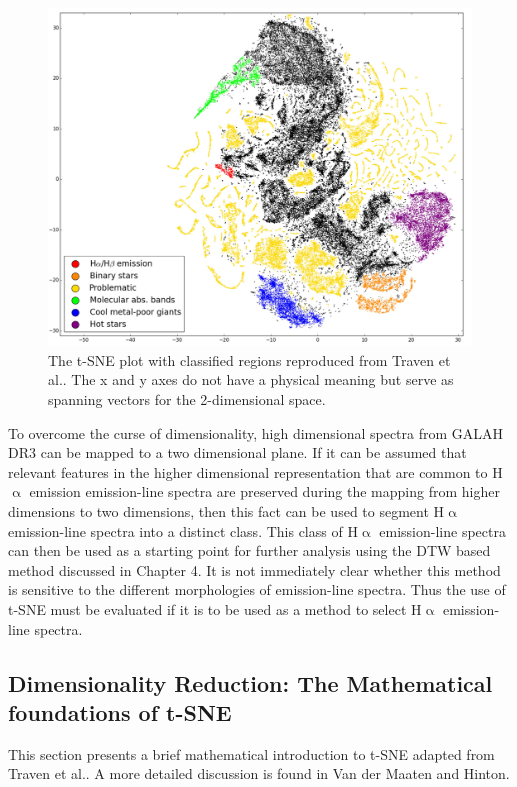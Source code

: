 \begin{figure}[!htb]
\centering
\includegraphics[scale=0.40]{figures/tsne traven.png}
\caption{The t-SNE plot with classified regions reproduced from Traven et al.\cite{traven2017galah}. The x and y axes do not have a physical meaning but serve as spanning vectors for the 2-dimensional space.}
\end{figure}

To overcome the curse of dimensionality, high dimensional spectra from GALAH DR3 can be mapped to a two dimensional plane. If it can be assumed that relevant features in the higher dimensional representation that are common to H$\upalpha$ emission emission-line spectra are preserved during the mapping from higher dimensions to two dimensions, then this fact can be used to segment H$\upalpha$ emission-line spectra into a distinct class. This class of H$\upalpha$ emission-line spectra can then be used as a starting point for further analysis using the DTW based method discussed in Chapter 4. It is not immediately clear whether this method is sensitive to the different morphologies of emission-line spectra. Thus the use of t-SNE must be evaluated if it is to be used as a method to select H$\upalpha$ emission-line spectra.

\subsection{Dimensionality Reduction: The Mathematical foundations of t-SNE}

This section presents a brief mathematical introduction to t-SNE adapted from Traven et al.\cite{traven2017galah}. A more detailed discussion is found in Van der Maaten and Hinton\cite{van2008visualizing}. 

